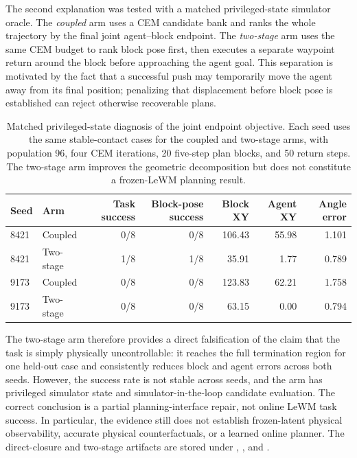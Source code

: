 \documentclass{article}
\begin{document}
The second explanation was tested with a matched privileged-state simulator
oracle.  The \emph{coupled} arm uses a CEM candidate bank and ranks the whole
trajectory by the final joint agent--block endpoint.  The \emph{two-stage} arm
uses the same CEM budget to rank block pose first, then executes a separate
waypoint return around the block before approaching the agent goal.  This
separation is motivated by the fact that a successful push may temporarily
move the agent away from its final position; penalizing that displacement
before block pose is established can reject otherwise recoverable plans.

\begin{table}[H]
\centering
\scriptsize
\setlength{\tabcolsep}{3pt}
\caption{Matched privileged-state diagnosis of the joint endpoint objective.
Each seed uses the same stable-contact cases for the coupled and two-stage
arms, with population 96, four CEM iterations, 20 five-step plan blocks, and
50 return steps. The two-stage arm improves the geometric decomposition but
does not constitute a frozen-LeWM planning result.}
\label{tab:supp-two-stage-oracle}
\begin{tabular}{llrrrrr}
\toprule
Seed & Arm & Task success & Block-pose success & Block XY & Agent XY & Angle error \\
\midrule
8421 & Coupled & 0/8 & 0/8 & 106.43 & 55.98 & 1.101 \\
8421 & Two-stage & 1/8 & 1/8 & 35.91 & 1.77 & 0.789 \\
9173 & Coupled & 0/8 & 0/8 & 123.83 & 62.21 & 1.758 \\
9173 & Two-stage & 0/8 & 0/8 & 63.15 & 0.00 & 0.794 \\
\bottomrule
\end{tabular}
\end{table}

The two-stage arm therefore provides a direct falsification of the claim that
the task is simply physically uncontrollable: it reaches the full termination
region for one held-out case and consistently reduces block and agent errors
across both seeds.  However, the success rate is not stable across seeds, and
the arm has privileged simulator state and simulator-in-the-loop candidate
evaluation.  The correct conclusion is a partial planning-interface repair,
not online LeWM task success.  In particular, the evidence still does not
establish frozen-latent physical observability, accurate physical
counterfactuals, or a learned online planner.  The direct-closure and
two-stage artifacts are stored under
,
, and
.
\end{document}

